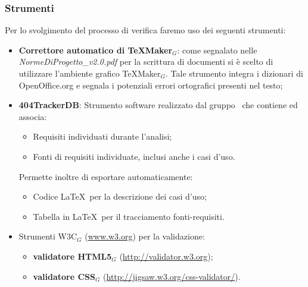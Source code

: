 \subsubsection{Strumenti}
Per lo svolgimento del processo di verifica faremo uso dei seguenti strumenti:
\begin{itemize}
	\item \textbf{Correttore automatico di TeXMaker$_G$}: come segnalato nelle \textit{NormeDiProgetto\_v2.0.pdf} per la scrittura di documenti si è scelto di utilizzare l'ambiente grafico TeXMaker$_G$. Tale strumento integra i dizionari di OpenOffice.org e segnala i potenziali
	errori ortografici presenti nel testo;

	\item \textbf{404TrackerDB}: Strumento software realizzato dal gruppo \gruppo\ che contiene ed associa:
	\begin{itemize}
		\item Requisiti individuati durante l'analisi;
		\item Fonti di requisiti individuate, inclusi anche i casi d'uso.
	\end{itemize}
	Permette inoltre di esportare automaticamente:
	\begin{itemize}
		\item Codice \LaTeX\ per la descrizione dei casi d'uso;
		\item Tabella in \LaTeX\ per il tracciamento fonti-requisiti.
	\end{itemize}

	\item Strumenti W3C$_G$ (\href{www.w3.org}{www.w3.org}) per la validazione:
	    \begin{itemize}
	    	\item \textbf{validatore HTML5$_G$} (\href{http://validator.w3.org}{http://validator.w3.org});
	    	\item \textbf{validatore CSS$_G$}
	    	(\href{http://jigsaw.w3.org/css-validator/}{http://jigsaw.w3.org/css-validator/}).
	    \end{itemize}
	

\end{itemize}

